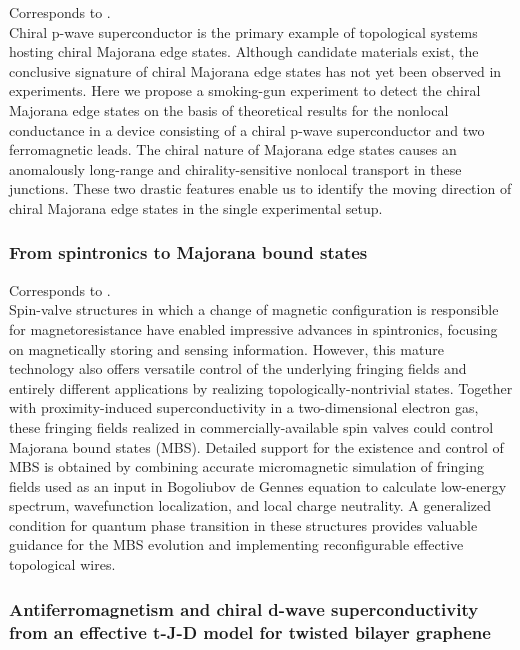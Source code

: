 Corresponds to \cite{2019Ikegaya}.\\

Chiral p-wave superconductor is the primary example of topological systems hosting chiral Majorana edge states. Although candidate materials exist, the conclusive signature of chiral Majorana edge states has not yet been observed in experiments. Here we propose a smoking-gun experiment to detect the chiral Majorana edge states on the basis of theoretical results for the nonlocal conductance in a device consisting of a chiral p-wave superconductor and two ferromagnetic leads. The chiral nature of Majorana edge states causes an anomalously long-range and chirality-sensitive nonlocal transport in these junctions. These two drastic features enable us to identify the moving direction of chiral Majorana edge states in the single experimental setup. 

\subsubsection{From spintronics to Majorana bound states}

Corresponds to \cite{2019Zhou}.\\

 Spin-valve structures in which a change of magnetic configuration is responsible for magnetoresistance have enabled impressive advances in spintronics, focusing on magnetically storing and sensing information. However, this mature technology also offers versatile control of the underlying fringing fields and entirely different applications by realizing topologically-nontrivial states. Together with proximity-induced superconductivity in a two-dimensional electron gas, these fringing fields realized in commercially-available spin valves could control Majorana bound states (MBS). Detailed support for the existence and control of MBS is obtained by combining accurate micromagnetic simulation of fringing fields used as an input in Bogoliubov de Gennes equation to calculate low-energy spectrum, wavefunction localization, and local charge neutrality. A generalized condition for quantum phase transition in these structures provides valuable guidance for the MBS evolution and implementing reconfigurable effective topological wires.
 
 \subsubsection{Antiferromagnetism and chiral d-wave superconductivity from an effective t-J-D model for twisted bilayer graphene}
 
